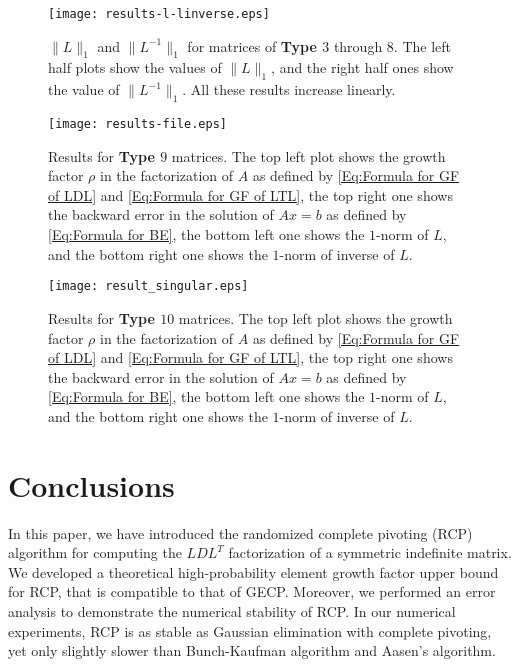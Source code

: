 \documentclass[11pt]{article}
\begin{document}
\begin{figure}[htbp]
\centering
\texttt{[image: results-l-linverse.eps]}
\caption{$\|L\|_1$ and $\|L^{-1}\|_1$ for matrices of {\bf Type $3$} through {\bf $8$}. The left half plots show the values of $\|L\|_1$, and the right half ones show the value of $\|L^{-1}\|_1$. All these results increase linearly.}\label{Fig:results of L}
\end{figure}

\begin{figure}[htbp]
  \centering
  \label{Fig:results of UF sparse matrix}\texttt{[image: results-file.eps]}
  \caption{Results for {\bf Type $9$} matrices. The top left plot shows the growth factor $\rho$ in the factorization of $A$ as defined by \eqref{Eq:Formula for GF of LDL} and \eqref{Eq:Formula for GF of LTL}, the top right one shows the backward error in the solution of $Ax=b$ as defined by \eqref{Eq:Formula for BE}, the bottom left one shows the $1$-norm of $L$, and the bottom right one shows the $1$-norm of inverse of $L$.}
\end{figure}

\begin{figure}[htbp]
\centering
\texttt{[image: result\_singular.eps]}
\caption{Results for {\bf Type $10$} matrices. The top left plot shows the growth factor $\rho$ in the factorization of $A$ as defined by \eqref{Eq:Formula for GF of LDL} and \eqref{Eq:Formula for GF of LTL}, the top right one shows the backward error in the solution of $Ax=b$ as defined by \eqref{Eq:Formula for BE}, the bottom left one shows the $1$-norm of $L$, and the bottom right one shows the $1$-norm of inverse of $L$.}\label{Fig:Results for rank deficient matrices}
\end{figure}

\section{Conclusions}\label{Sec:Conclusions}
In this paper, we have introduced the randomized complete pivoting (RCP) algorithm for computing the $LDL^T$ factorization of a symmetric indefinite matrix. We developed a theoretical high-probability element growth factor upper bound for RCP, that is compatible to that of GECP. Moreover, we performed an error analysis to demonstrate the numerical stability of RCP. In our numerical experiments, RCP is as stable as Gaussian elimination with complete pivoting, yet only slightly slower than Bunch-Kaufman algorithm and Aasen's algorithm.



\end{document}
